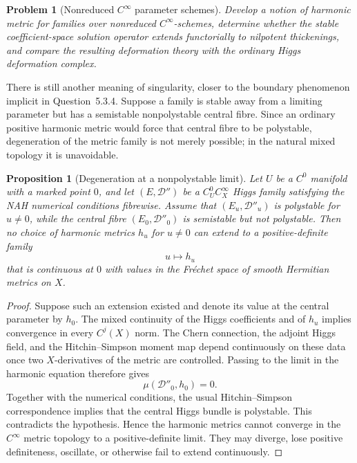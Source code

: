 \documentclass[11pt,reqno]{amsart}
\newtheorem{proposition}[theorem]{Proposition}
\newtheorem{problem}[theorem]{Problem}
\theoremstyle{definition}
\theoremstyle{remark}
\newcommand{\cD}{\mathcal D}
\begin{document}
\begin{problem}[Nonreduced $C^\infty$ parameter schemes]\label{prob:nonreduced-Cinfty}
Develop a notion of harmonic metric for families over nonreduced $C^\infty$-schemes, determine whether the stable coefficient-space solution operator extends functorially to nilpotent thickenings, and compare the resulting deformation theory with the ordinary Higgs deformation complex.
\end{problem}

There is still another meaning of singularity, closer to the boundary phenomenon implicit in Question~5.3.4.  Suppose a family is stable away from a limiting parameter but has a semistable nonpolystable central fibre.  Since an ordinary positive harmonic metric would force that central fibre to be polystable, degeneration of the metric family is not merely possible; in the natural mixed topology it is unavoidable.

\begin{proposition}[Degeneration at a nonpolystable limit]\label{prop:nonpoly-limit-degeneration}
Let $U$ be a $C^0$ manifold with a marked point $0$, and let $(E,\cD'')$ be a $C^0_UC^\infty_X$ Higgs family satisfying the NAH numerical conditions fibrewise.  Assume that $(E_u,\cD''_u)$ is polystable for $u\neq0$, while the central fibre $(E_0,\cD''_0)$ is semistable but not polystable.  Then no choice of harmonic metrics $h_u$ for $u\neq0$ can extend to a positive-definite family
\[
  u\longmapsto h_u
\]
that is continuous at $0$ with values in the Fr\'echet space of smooth Hermitian metrics on $X$.
\end{proposition}

\begin{proof}
Suppose such an extension existed and denote its value at the central parameter by $h_0$.  The mixed continuity of the Higgs coefficients and of $h_u$ implies convergence in every $C^j(X)$ norm.  The Chern connection, the adjoint Higgs field, and the Hitchin--Simpson moment map depend continuously on these data once two $X$-derivatives of the metric are controlled.  Passing to the limit in the harmonic equation therefore gives
\[
  \mu(\cD''_0,h_0)=0.
\]
Together with the numerical conditions, the usual Hitchin--Simpson correspondence implies that the central Higgs bundle is polystable.  This contradicts the hypothesis.  Hence the harmonic metrics cannot converge in the $C^\infty$ metric topology to a positive-definite limit.  They may diverge, lose positive definiteness, oscillate, or otherwise fail to extend continuously.
\end{proof}
\end{document}
